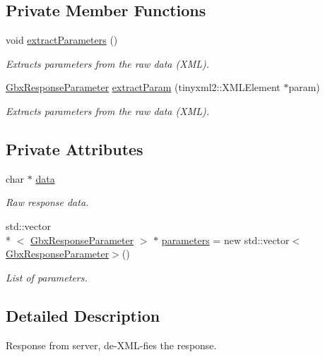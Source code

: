 \subsection*{Private Member Functions}
\begin{DoxyCompactItemize}
\item 
void \hyperlink{classGbxResponse_a3cd4d6c5458fcd5359b8f5d9921a2a9b}{extract\-Parameters} ()
\begin{DoxyCompactList}\small\item\em Extracts parameters from the raw data (X\-M\-L). \end{DoxyCompactList}\item 
\hyperlink{classGbxResponseParameter}{Gbx\-Response\-Parameter} \hyperlink{classGbxResponse_af8501950f3b82ce74924f3bda746871b}{extract\-Param} (tinyxml2\-::\-X\-M\-L\-Element $\ast$param)
\begin{DoxyCompactList}\small\item\em Extracts parameters from the raw data (X\-M\-L). \end{DoxyCompactList}\end{DoxyCompactItemize}
\subsection*{Private Attributes}
\begin{DoxyCompactItemize}
\item 
char $\ast$ \hyperlink{classGbxResponse_aee1c7b03d870c87883bd97740afd7675}{data}
\begin{DoxyCompactList}\small\item\em Raw response data. \end{DoxyCompactList}\item 
std\-::vector\\*
$<$ \hyperlink{classGbxResponseParameter}{Gbx\-Response\-Parameter} $>$ $\ast$ \hyperlink{classGbxResponse_afcbec4555fa682d9d1360ecff829d0f2}{parameters} = new std\-::vector$<$\hyperlink{classGbxResponseParameter}{Gbx\-Response\-Parameter}$>$()
\begin{DoxyCompactList}\small\item\em List of parameters. \end{DoxyCompactList}\end{DoxyCompactItemize}


\subsection{Detailed Description}
Response from server, de-\/\-X\-M\-L-\/fies the response. 

